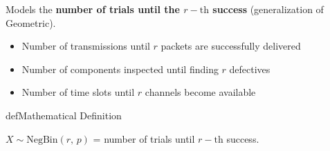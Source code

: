 \begin{Shaded}
\begin{Highlighting}[]
\NormalTok{(}\OperatorTok{,}\OperatorTok{,}\NormalTok{)}\OperatorTok{;}
\NormalTok{(}\OperatorTok{,} \OperatorTok{,} \OperatorTok{,} \OperatorTok{,} \NormalTok{)}\OperatorTok{;}
\NormalTok{(}\NormalTok{)}\OperatorTok{;} \NormalTok{(}\NormalTok{)}\OperatorTok{;}
\NormalTok{(}\NormalTok{)}\OperatorTok{;}
 \OperatorTok{;}

\NormalTok{(}\OperatorTok{,} \OperatorTok{/}\OperatorTok{,} \NormalTok{(}\NormalTok{))}\OperatorTok{;}
\end{Highlighting}
\end{Shaded}



Models the \textbf{number of trials until the $r-\mathrm{th}$ success} (generalization of Geometric).


\begin{itemize}
\tightlist
\item
  Number of transmissions until $r$ packets are successfully delivered
\item
  Number of components inspected until finding $r$ defectives
\item
  Number of time slots until $r$ channels become available
\end{itemize}

\begin{PSbox}[unbreakable]{def}{Mathematical Definition}

$X \sim \mathrm{NegBin}(r,\, p)$ = number of trials until $r-\mathrm{th}$ success.

\end{PSbox}

